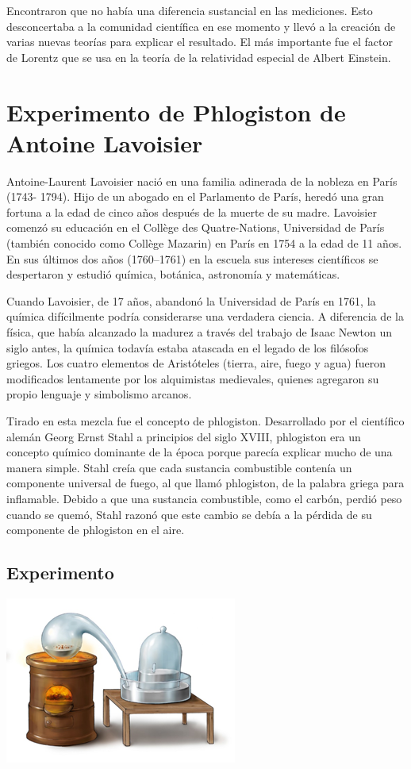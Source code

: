 \documentclass[letterpaper, 10pt, journal]{IEEEtran}
\begin{document}
Encontraron que no había una diferencia sustancial en las mediciones. Esto desconcertaba a la comunidad científica en ese momento y llevó a la creación de varias nuevas teorías para explicar el resultado. El más importante fue el factor de Lorentz que se usa en la teoría de la relatividad especial de Albert Einstein.

\section{Experimento de Phlogiston de Antoine Lavoisier}
Antoine-Laurent Lavoisier nació en una familia adinerada de la nobleza en París (1743- 1794). Hijo de un abogado en el Parlamento de París, heredó una gran fortuna a la edad de cinco años después de la muerte de su madre. Lavoisier comenzó su educación en el Collège des Quatre-Nations, Universidad de París (también conocido como Collège Mazarin) en París en 1754 a la edad de 11 años. En sus últimos dos años (1760–1761) en la escuela sus intereses científicos se despertaron y estudió química, botánica, astronomía y matemáticas.

Cuando Lavoisier, de 17 años, abandonó la Universidad de París en 1761, la química difícilmente podría considerarse una verdadera ciencia. A diferencia de la física, que había alcanzado la madurez a través del trabajo de Isaac Newton un siglo antes, la química todavía estaba atascada en el legado de los filósofos griegos. Los cuatro elementos de Aristóteles (tierra, aire, fuego y agua) fueron modificados lentamente por los alquimistas medievales, quienes agregaron su propio lenguaje y simbolismo arcanos.

Tirado en esta mezcla fue el concepto de phlogiston. Desarrollado por el científico alemán Georg Ernst Stahl a principios del siglo XVIII, phlogiston era un concepto químico dominante de la época porque parecía explicar mucho de una manera simple. Stahl creía que cada sustancia combustible contenía un componente universal de fuego, al que llamó phlogiston, de la palabra griega para inflamable. Debido a que una sustancia combustible, como el carbón, perdió peso cuando se quemó, Stahl razonó que este cambio se debía a la pérdida de su componente de phlogiston en el aire.

\subsection{Experimento}
\includegraphics[scale=1.5]{caldera}
\end{document}
